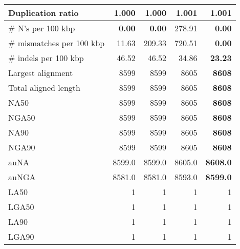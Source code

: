 \documentclass[12pt,a4paper]{article}
\begin{document}
\begin{table}[ht]
\begin{center}
\begin{tabular}{|l*{4}{|r}|}
Duplication ratio & {\bf 1.000} & {\bf 1.000} & 1.001 & 1.001 \\ \hline
\# N's per 100 kbp & {\bf 0.00} & {\bf 0.00} & 278.91 & {\bf 0.00} \\ \hline
\# mismatches per 100 kbp & 11.63 & 209.33 & 720.51 & {\bf 0.00} \\ \hline
\# indels per 100 kbp & 46.52 & 46.52 & 34.86 & {\bf 23.23} \\ \hline
Largest alignment & 8599 & 8599 & 8605 & {\bf 8608} \\ \hline
Total aligned length & 8599 & 8599 & 8605 & {\bf 8608} \\ \hline
NA50 & 8599 & 8599 & 8605 & {\bf 8608} \\ \hline
NGA50 & 8599 & 8599 & 8605 & {\bf 8608} \\ \hline
NA90 & 8599 & 8599 & 8605 & {\bf 8608} \\ \hline
NGA90 & 8599 & 8599 & 8605 & {\bf 8608} \\ \hline
auNA & 8599.0 & 8599.0 & 8605.0 & {\bf 8608.0} \\ \hline
auNGA & 8581.0 & 8581.0 & 8593.0 & {\bf 8599.0} \\ \hline
LA50 & 1 & 1 & 1 & 1 \\ \hline
LGA50 & 1 & 1 & 1 & 1 \\ \hline
LA90 & 1 & 1 & 1 & 1 \\ \hline
LGA90 & 1 & 1 & 1 & 1 \\ \hline
\end{tabular}
\end{center}
\end{table}
\end{document}

